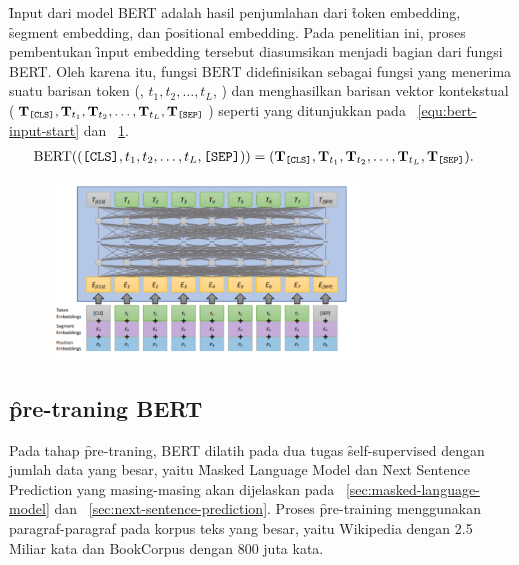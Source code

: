 \f{Input} dari model BERT adalah hasil penjumlahan dari \f{token embedding}, \f{segment embedding}, dan \f{positional embedding}. Pada penelitian ini, proses pembentukan \f{input embedding} tersebut diasumsikan menjadi bagian dari fungsi BERT. Oleh karena itu, fungsi $\text{BERT}$ didefinisikan sebagai fungsi yang menerima suatu barisan token (\code{[CLS]}, $t_1, t_2, \dots, t_L$, \code{[SEP]}) dan menghasilkan barisan vektor kontekstual ($\mathbf{T}_{\text{\texttt{[CLS]}}}, \mathbf{T}_{t_1}, \mathbf{T}_{t_2}, \dots, \mathbf{T}_{t_L}, \mathbf{T}_{\text{\texttt{[SEP]}}}$) seperti yang ditunjukkan pada \equ~\ref{equ:bert-input-start} dan \pic~\ref{fig:input-representation}.
\begin{align}
	\label{equ:bert-input-start}
	\text{BERT}((\text{\texttt{[CLS]}}, t_1, t_2, \dots, t_L, \text{\texttt{[SEP]}})) &= (\mathbf{T}_{\text{\texttt{[CLS]}}}, \mathbf{T}_{t_1}, \mathbf{T}_{t_2}, \dots, \mathbf{T}_{t_L}, \mathbf{T}_{\text{\texttt{[SEP]}}}).
\end{align}
\begin{figure}[!ht]
	\centering
	\includegraphics[width=0.75\textwidth]{assets/pics/representasibert.png}
	\label{fig:input-representation}
\end{figure}

\subsection{\f{pre-traning} BERT}

	Pada tahap \f{pre-traning}, BERT dilatih pada dua tugas \f{self-supervised} dengan jumlah data yang besar, yaitu \f{Masked Language Model} dan \f{Next Sentence Prediction} yang masing-masing akan dijelaskan pada \sect~\ref{sec:masked-language-model} dan \sect~\ref{sec:next-sentence-prediction}. Proses \f{pre-training} menggunakan paragraf-paragraf pada korpus teks yang besar, yaitu Wikipedia dengan 2.5 Miliar kata dan BookCorpus dengan 800 juta kata.


